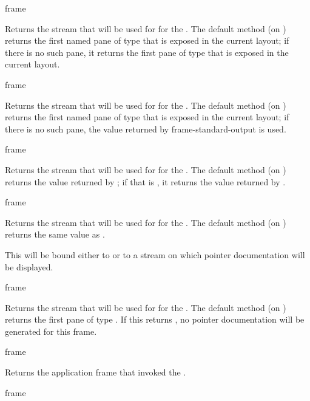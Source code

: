  {frame}

Returns the stream that will be used for  for the
 .  The default method (on
) returns the first named pane of type
 that is exposed in the current layout; if there is no such
pane, it returns the first pane of type  that is exposed in
the current layout.

 {frame}

Returns the stream that will be used for  for the
 .  The default method (on
) returns the first named pane of type
 that is exposed in the current layout; if there is no such
pane, the value returned by {frame-standard-output} is used.

 {frame}

Returns the stream that will be used for  for the 
.  The default method (on ) returns
the value returned by ; if that is , it returns
the value returned by .

 {frame}

Returns the stream that will be used for  for the
 .  The default method (on
) returns the same value as
.


This will be bound either to  or to a stream on which pointer
documentation will be displayed.

 {frame}

Returns the stream that will be used for 
for the  .  The default method (on
) returns the first pane of type
.  If this returns , no pointer
documentation will be generated for this frame.


 {frame}

Returns the application frame that invoked the  .

 {frame}

